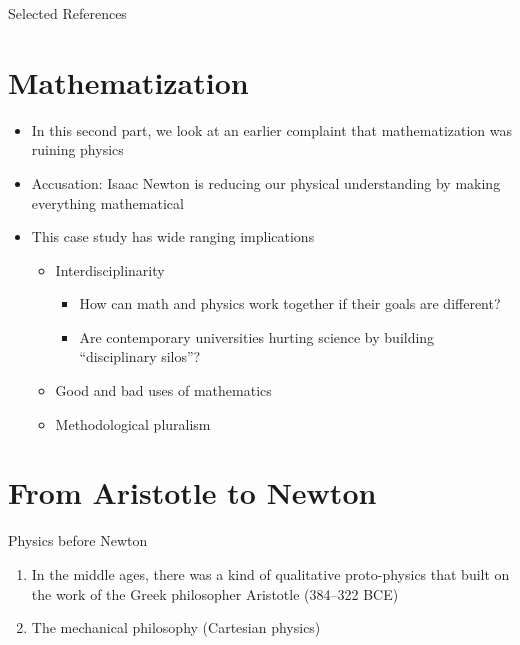 \documentclass[fleqn]{beamer}
\begin{document}
\begin{frame}[allowframebreaks]{Selected References}
\printbibliography[heading=none, keyword=scientific-explanation]
\end{frame}

\section{Mathematization}

\begin{frame}

  \begin{itemize}
  \item In this second part, we look at an earlier complaint that
    mathematization was ruining physics
  \item Accusation: Isaac Newton is reducing our physical
    understanding by making everything mathematical
  \end{itemize}

\end{frame}

\begin{frame}
\begin{itemize}
\item This case study has wide ranging implications
  \begin{itemize}
  \item Interdisciplinarity
    \begin{itemize}
    \item How can math and physics work together if their goals are
      different?
    \item Are contemporary universities hurting science by building
      ``disciplinary silos''?
    \end{itemize}
  \item Good and bad uses of mathematics
  \item Methodological pluralism
   \end{itemize}
\end{itemize}

\end{frame}


\section{From Aristotle to Newton}


\begin{frame}{Physics before Newton}

  \begin{enumerate}
  \item In the middle ages, there was a kind of qualitative
    proto-physics that built on the work of the Greek philosopher
    Aristotle (384--322 BCE)
  \item The mechanical philosophy (Cartesian physics)
  \end{enumerate}

\end{frame}
\end{document}
